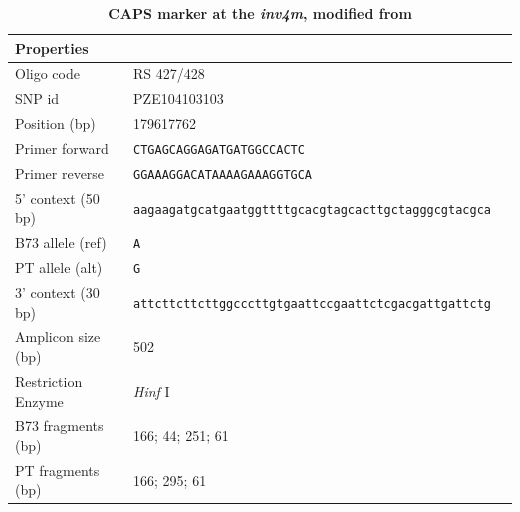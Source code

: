 \documentclass[10pt,letterpaper]{article}
\begin{document}
\begin{table}[!h]
\caption {\label{tab:cap} \textbf{CAPS marker at the \textit{inv4m}, modified from  \cite{aguilarrangel2018}}}
\begin{center}
\begin{adjustbox}{width=0.9\textwidth}
\begin{tabular}{@{}lll@{}}
\toprule
\textbf{Properties} &                                                    &  \\ \midrule
Oligo code               & RS 427/428                                         &  \\
SNP id                & PZE104103103                                       &  \\
Position (bp)            & 179617762                                          &  \\
Primer forward           & \texttt{CTGAGCAGGAGATGATGGCCACTC } &  \\
Primer reverse           & \texttt{GGAAAGGACATAAAAGAAAGGTGCA} &  \\
5' context (50 bp) & \texttt{aagaagatgcatgaatggttttgcacgtagcacttgctagggcgtacgca} &  \\
B73 allele (ref)         & \texttt{A}                                                  &  \\
PT allele (alt)          & \texttt{G}                                                  &  \\
3' context (30 bp) & \texttt{attcttcttcttggcccttgtgaattccgaattctcgacgattgattctg} &  \\
Amplicon size (bp)       & 502                                                &  \\
Restriction Enzyme       & \textit{Hinf} I                                             &  \\
B73 fragments  (bp)      & 166; 44; 251; 61                                   &  \\
PT fragments    (bp)     & 166; 295; 61                                       &  \\ \bottomrule
\end{tabular}
\end{adjustbox}
\end{center}
\end{table}
\end{document}
